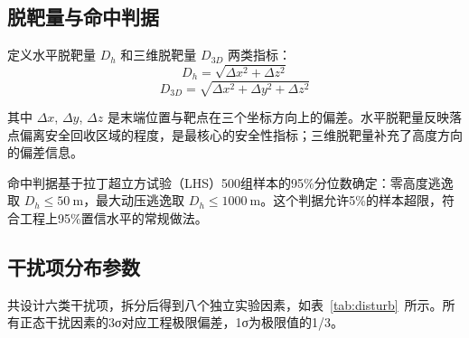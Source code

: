 \subsection{脱靶量与命中判据}

 定义水平脱靶量 $D_h$ 和三维脱靶量 $D_{3D}$ 两类指标：
\begin{equation}
D_h = \sqrt{\Delta x^2 + \Delta z^2} 
\end{equation}
\begin{equation}
D_{3D} = \sqrt{\Delta x^2 + \Delta y^2 + \Delta z^2} 
\end{equation}

 其中 $\Delta x$, $\Delta y$, $\Delta z$ 是末端位置与靶点在三个坐标方向上的偏差。水平脱靶量反映落点偏离安全回收区域的程度，是最核心的安全性指标；三维脱靶量补充了高度方向的偏差信息。

  命中判据基于拉丁超立方试验（LHS）500组样本的95\%分位数确定：零高度逃逸取 $D_h \le 50\ \mathrm{m}$，最大动压逃逸取 $D_h \le 1000\ \mathrm{m}$。这个判据允许5\%的样本超限，符合工程上95\%置信水平的常规做法。

\subsection{干扰项分布参数}

共设计六类干扰项，拆分后得到八个独立实验因素，如表~\ref{tab:disturb}~所示。所有正态干扰因素的3σ对应工程极限偏差，1σ为极限值的1/3。

